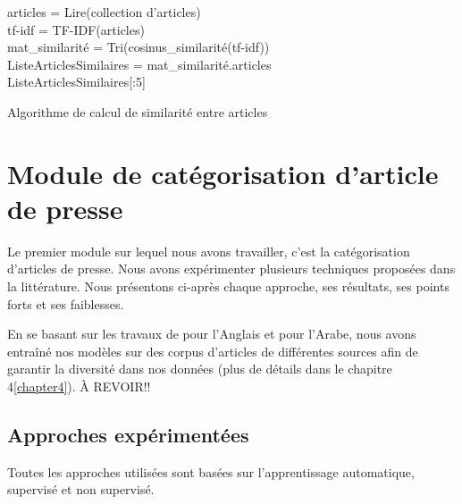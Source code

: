     \begin{algorithm2e}[H]
        \SetAlgoLined
        articles = Lire(collection d'articles)\\
        tf-idf = TF-IDF(articles)\\
        mat\_similarité = Tri(cosinus\_similarité(tf-idf))\\
        ListeArticlesSimilaires = mat\_similarité.articles\\
        \Return ListeArticlesSimilaires[:5]
        \caption{Algorithme de calcul de similarité entre articles}
    \end{algorithm2e}


\section{Module de catégorisation d'article de presse}
Le premier module sur lequel nous avons travailler, c'est la catégorisation d'articles de presse. Nous avons expérimenter plusieurs techniques proposées dans la littérature. Nous présentons ci-après chaque approche, ses résultats, ses points forts et ses faiblesses.

En se basant sur les travaux de \cite{categorisation} pour l'Anglais et \cite{categorisation} pour l'Arabe, nous avons entraîné nos modèles sur des corpus d'articles de différentes sources afin de garantir la diversité dans nos données (plus de détails dans le chapitre 4\ref{chapter4}).
À REVOIR!!

    \subsection{Approches expérimentées\label{approches}}
    Toutes les approches utilisées sont basées sur l'apprentissage automatique, supervisé et non supervisé. 


